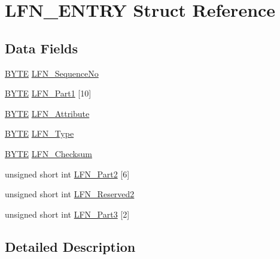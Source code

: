 \hypertarget{struct_l_f_n___e_n_t_r_y}{}\section{L\+F\+N\+\_\+\+E\+N\+T\+R\+Y Struct Reference}
\label{struct_l_f_n___e_n_t_r_y}
\subsection*{Data Fields}
\begin{DoxyCompactItemize}
\item 
\hyperlink{_generic_type_defs_8h_a4ae1dab0fb4b072a66584546209e7d58}{B\+Y\+T\+E} \hyperlink{struct_l_f_n___e_n_t_r_y_ac72fdaed5dd9bab2b565f2641a640ed2}{L\+F\+N\+\_\+\+Sequence\+No}
\item 
\hyperlink{_generic_type_defs_8h_a4ae1dab0fb4b072a66584546209e7d58}{B\+Y\+T\+E} \hyperlink{struct_l_f_n___e_n_t_r_y_adfce60ac11522b7181f15eefb8d287bd}{L\+F\+N\+\_\+\+Part1} \mbox{[}10\mbox{]}
\item 
\hyperlink{_generic_type_defs_8h_a4ae1dab0fb4b072a66584546209e7d58}{B\+Y\+T\+E} \hyperlink{struct_l_f_n___e_n_t_r_y_a945202a07480953785c9bd92f968b151}{L\+F\+N\+\_\+\+Attribute}
\item 
\hyperlink{_generic_type_defs_8h_a4ae1dab0fb4b072a66584546209e7d58}{B\+Y\+T\+E} \hyperlink{struct_l_f_n___e_n_t_r_y_a8218c90badac6db18f565dc25c5646f6}{L\+F\+N\+\_\+\+Type}
\item 
\hyperlink{_generic_type_defs_8h_a4ae1dab0fb4b072a66584546209e7d58}{B\+Y\+T\+E} \hyperlink{struct_l_f_n___e_n_t_r_y_a338f68886f444399176fe379d47f1001}{L\+F\+N\+\_\+\+Checksum}
\item 
unsigned short int \hyperlink{struct_l_f_n___e_n_t_r_y_adc91b16cd301666ba780ba866802fa1a}{L\+F\+N\+\_\+\+Part2} \mbox{[}6\mbox{]}
\item 
unsigned short int \hyperlink{struct_l_f_n___e_n_t_r_y_ac4b1f1caa8ba59225a1c197a541bf244}{L\+F\+N\+\_\+\+Reserved2}
\item 
unsigned short int \hyperlink{struct_l_f_n___e_n_t_r_y_af95eb4fd7b09567f008909ff710e88a9}{L\+F\+N\+\_\+\+Part3} \mbox{[}2\mbox{]}
\end{DoxyCompactItemize}


\subsection{Detailed Description}


